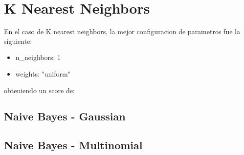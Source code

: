 \section{K Nearest Neighbors}

En el caso de K nearest neighbors, la mejor configuracion de parametros fue la siguiente:
\begin{itemize}
  \item{n\_neighbors: 1}
  \item{weights: "uniform"}
\end{itemize}

obteniendo un score de:


\subsection{Naive Bayes - Gaussian}

\subsection{Naive Bayes - Multinomial}
